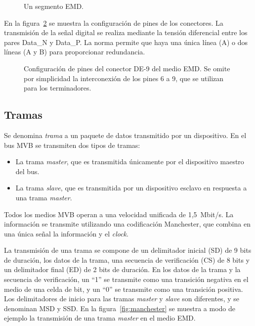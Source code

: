 \begin{figure}[htbp]
	\centering
    {
        \fontsize{9pt}{9pt}\selectfont
        
    }
	\caption[Un segmento EMD]{Un segmento EMD.}
    \label{fig:segmento}
\end{figure}

En la figura~\ref{fig:db9} se muestra la configuración de pines de los conectores.
La transmisión de la señal digital se realiza mediante la tensión diferencial entre los pares Data\_N y Data\_P. La norma permite que haya una única línea (A) o dos líneas (A y B) para proporcionar redundancia.

\begin{figure}[htbp]
	\centering
    {
        \fontsize{9pt}{9pt}\selectfont
        
    }
	\caption[Configuración de pines del conector D-sub de 9 pines del medio EMD]{Configuración de pines del conector DE-9 del medio EMD. Se omite por simplicidad la interconexión de los pines 6 a 9, que se utilizan para los terminadores.}
    \label{fig:db9}
\end{figure}

\subsection{Tramas}

Se denomina \textit{trama} a un paquete de datos transmitido por un dispositivo.
En el bus MVB se transmiten dos tipos de tramas:

\begin{itemize}
\item La trama \textit{master}, que es transmitida únicamente por el dispositivo maestro del bus.
\item La trama \textit{slave}, que es transmitida por un dispositivo esclavo en respuesta a una trama \textit{master}.
\end{itemize}

Todos los medios MVB operan a una velocidad unificada de 1,5~Mbit/s.
La información se transmite utilizando una codificación Manchester, que combina en una única señal la información y el \textit{clock}.

La transmisión de una trama se compone de un delimitador inicial (SD) de 9 bits de duración, los datos de la trama, una secuencia de verificación (CS) de 8 bits y un delimitador final (ED) de 2 bits de duración.
En los datos de la trama y la secuencia de verificación, un ``1'' se transmite como una transición negativa en el medio de una celda de bit, y un ``0'' se transmite como una transición positiva.
Los delimitadores de inicio para las tramas \textit{master} y \textit{slave} son diferentes, y se denominan MSD y SSD.
En la figura~\ref{fig:manchester} se muestra a modo de ejemplo la transmisión de una trama \textit{master} en el medio EMD.

